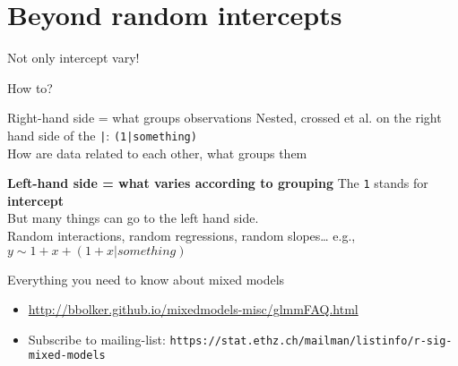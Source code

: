 \documentclass{beamer}
\begin{document}
\section{Beyond random intercepts}

\begin{frame}{Not only intercept vary!}
\centering
\end{frame}

\begin{frame}{How to?}

\begin{alertblock}{Right-hand side = what groups observations}
Nested, crossed et al. on the right hand side of the \texttt{|}: \texttt{(1|something)}\\
How are data related to each other, what groups them\\
\end{alertblock}


\pause
\begin{alertblock}{\textbf{Left-hand side = what varies according to grouping}}
The \texttt{1} stands for \textbf{intercept}\\
But many things can go to the left hand side. \\
Random interactions, random regressions, random slopes\dots
 e.g., $y \sim 1 + x + (1 + x | something)$
\end{alertblock}
 
\end{frame}



\begin{frame}{Everything you need to know about mixed models}

\begin{itemize}
 \item \url{http://bbolker.github.io/mixedmodels-misc/glmmFAQ.html}
 \item Subscribe to mailing-list: \texttt{https://stat.ethz.ch/mailman/listinfo/r-sig-mixed-models}
\end{itemize}

\end{frame}
\end{document}
